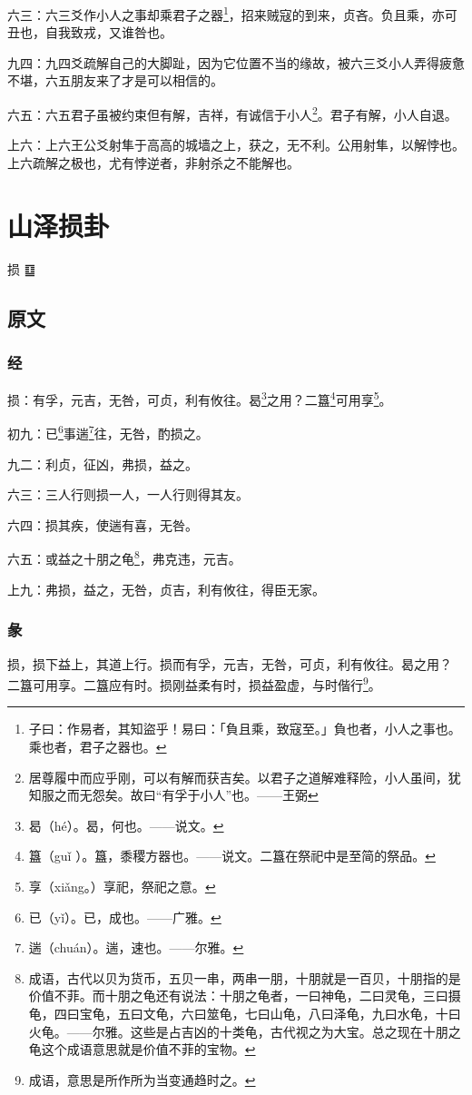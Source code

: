 \documentclass[12pt,oneside]{book}
\begin{document}
六三：六三爻作小人之事却乘君子之器\footnote{子曰：作易者，其知盜乎！易曰：「負且乘，致寇至。」負也者，小人之事也。乘也者，君子之器也。}，招来贼寇的到来，贞吝。负且乘，亦可丑也，自我致戎，又谁咎也。

九四：九四爻疏解自己的大脚趾，因为它位置不当的缘故，被六三爻小人弄得疲惫不堪，六五朋友来了才是可以相信的。

六五：六五君子虽被约束但有解，吉祥，有诚信于小人\footnote{居尊履中而应乎刚，可以有解而获吉矣。以君子之道解难释险，小人虽间，犹知服之而无怨矣。故曰“有孚于小人”也。——王弼}。君子有解，小人自退。

上六：上六王公爻射隼于高高的城墙之上，获之，无不利。公用射隼，以解悖也。上六疏解之极也，尤有悖逆者，非射杀之不能解也。


\chapter{山泽损卦}
损 {\Large ䷨}
\section{原文}

\subsection{经}
损：有孚，元吉，无咎，可贞，利有攸往。曷\footnote{曷（hé）。曷，何也。——说文。}之用？二簋\footnote{簋（guǐ ）。簋，黍稷方器也。——说文。二簋在祭祀中是至简的祭品。}可用享\footnote{享（xiǎng。）享祀，祭祀之意。}。

初九：已\footnote{已（yǐ）。已，成也。——广雅。}事遄\footnote{遄（chuán）。遄，速也。——尔雅。}往，无咎，酌损之。

九二：利贞，征凶，弗损，益之。

六三：三人行则损一人，一人行则得其友。

六四：损其疾，使遄有喜，无咎。

六五：或益之十朋之龟\footnote{成语，古代以贝为货币，五贝一串，两串一朋，十朋就是一百贝，十朋指的是价值不菲。而十朋之龟还有说法：十朋之龟者，一曰神龟，二曰灵龟，三曰摄龟，四曰宝龟，五曰文龟，六曰筮龟，七曰山龟，八曰泽龟，九曰水龟，十曰火龟。——尔雅。这些是占吉凶的十类龟，古代视之为大宝。总之现在十朋之龟这个成语意思就是价值不菲的宝物。}，弗克违，元吉。

上九：弗损，益之，无咎，贞吉，利有攸往，得臣无家。

\subsection{彖}
损，损下益上，其道上行。损而有孚，元吉，无咎，可贞，利有攸往。曷之用？ 二簋可用享。二簋应有时。损刚益柔有时，损益盈虚，与时偕行\footnote{成语，意思是所作所为当变通趋时之。}。
\end{document}
